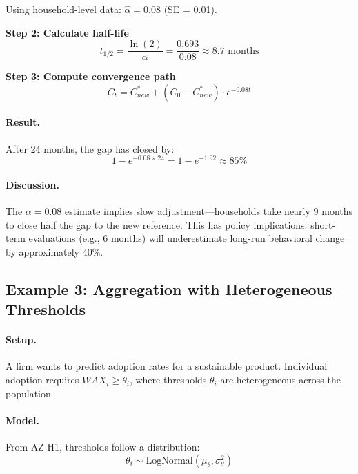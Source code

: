 Using household-level data: $\hat{\alpha} = 0.08$ (SE = 0.01).

\textbf{Step 2: Calculate half-life}
\begin{equation}
t_{1/2} = \frac{\ln(2)}{\alpha} = \frac{0.693}{0.08} \approx 8.7 \text{ months}
\end{equation}

\textbf{Step 3: Compute convergence path}
\begin{equation}
C_t = C^*_{new} + (C_0 - C^*_{new}) \cdot e^{-0.08t}
\end{equation}

\paragraph{Result.}

After 24 months, the gap has closed by:
\begin{equation}
1 - e^{-0.08 \times 24} = 1 - e^{-1.92} \approx 85\%
\end{equation}

\paragraph{Discussion.}

The $\alpha = 0.08$ estimate implies slow adjustment---households take nearly
9 months to close half the gap to the new reference. This has policy implications:
short-term evaluations (e.g., 6 months) will underestimate long-run behavioral
change by approximately 40\%.


\subsection{Example 3: Aggregation with Heterogeneous Thresholds}

\paragraph{Setup.}
A firm wants to predict adoption rates for a sustainable product.
Individual adoption requires $WAX_i \geq \theta_i$, where thresholds
$\theta_i$ are heterogeneous across the population.

\paragraph{Model.}
From AZ-H1, thresholds follow a distribution:
\begin{equation}
\theta_i \sim \text{LogNormal}(\mu_\theta, \sigma_\theta^2)
\end{equation}

